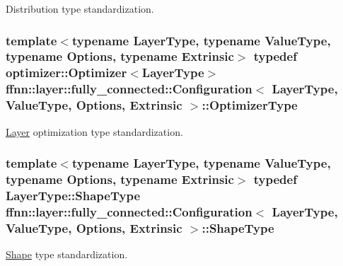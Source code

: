 Distribution type standardization. 

\hypertarget{classffnn_1_1layer_1_1fully__connected_1_1_configuration_ab1936b042b4c8a89da3031e2d5e767e4}{
\subsubsection[{Optimizer\-Type}]{\setlength{\rightskip}{0pt plus 5cm}template$<$typename Layer\-Type, typename Value\-Type, typename Options, typename Extrinsic$>$ typedef {\bf optimizer\-::\-Optimizer}$<${\bf Layer\-Type}$>$ {\bf ffnn\-::layer\-::fully\-\_\-connected\-::\-Configuration}$<$ {\bf Layer\-Type}, Value\-Type, Options, Extrinsic $>$\-::{\bf Optimizer\-Type}}}\label{classffnn_1_1layer_1_1fully__connected_1_1_configuration_ab1936b042b4c8a89da3031e2d5e767e4}


\hyperlink{classffnn_1_1layer_1_1_layer}{Layer} optimization type standardization. 

\hypertarget{classffnn_1_1layer_1_1fully__connected_1_1_configuration_ade943726f101a3d900d19c72707a56a3}{
\subsubsection[{Shape\-Type}]{\setlength{\rightskip}{0pt plus 5cm}template$<$typename Layer\-Type, typename Value\-Type, typename Options, typename Extrinsic$>$ typedef Layer\-Type\-::\-Shape\-Type {\bf ffnn\-::layer\-::fully\-\_\-connected\-::\-Configuration}$<$ {\bf Layer\-Type}, Value\-Type, Options, Extrinsic $>$\-::{\bf Shape\-Type}}}\label{classffnn_1_1layer_1_1fully__connected_1_1_configuration_ade943726f101a3d900d19c72707a56a3}


\hyperlink{structffnn_1_1layer_1_1_shape}{Shape} type standardization. 



